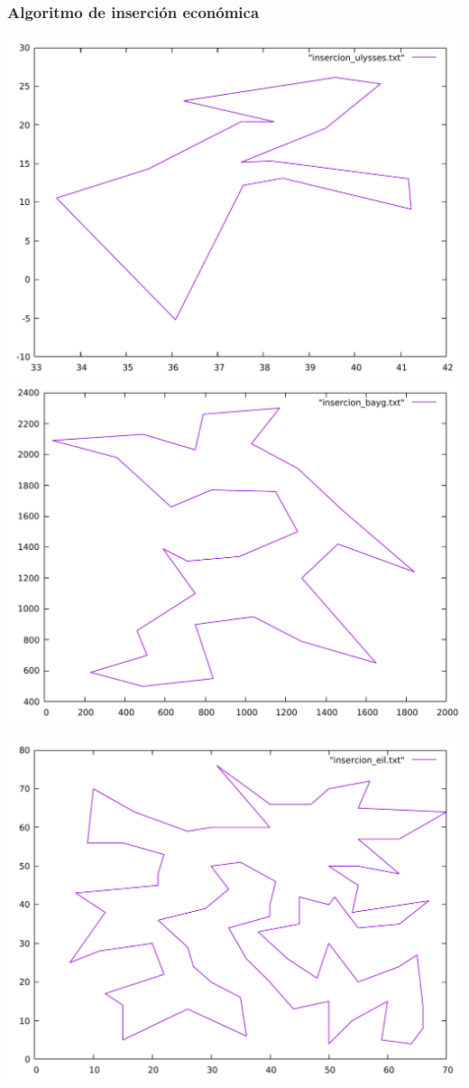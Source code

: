 \documentclass[13pt]{beamer}
\begin{document}
	\begin{frame}
		\frametitle{Algoritmo de inserción económica}
			\includegraphics[scale=0.2]{../src/insercion_ulysses.pdf}
			\includegraphics[scale=0.2]{../src/insercion_bayg.pdf}
			\begin{center}
				\includegraphics[scale=0.2]{../src/insercion_eil.pdf}
			\end{center}
	\end{frame}
\end{document}

